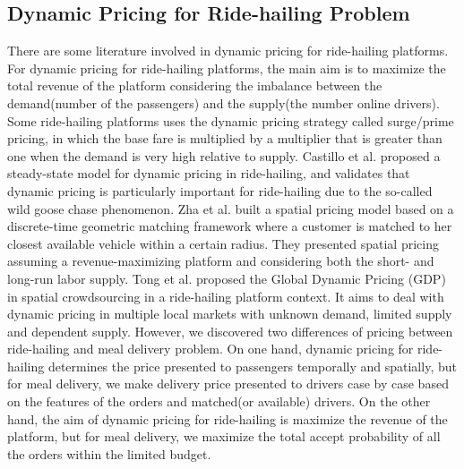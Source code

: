 \documentclass[sigconf,authordraft]{acmart}
\begin{document}
\subsection{Dynamic Pricing for Ride-hailing Problem}
There are some literature involved in dynamic pricing for ride-hailing platforms. For dynamic pricing for ride-hailing platforms, the main aim is to maximize the total revenue of the platform considering the imbalance between the demand(number of the passengers) and the supply(the number online drivers). Some ride-hailing platforms uses the dynamic pricing strategy called surge/prime pricing, in which the base fare is multiplied by a multiplier that is greater than one when the demand is very high relative to supply\cite{hall2015effects}. Castillo et al.\cite{castillo2017surge} proposed a steady-state model for dynamic pricing in ride-hailing, and validates that dynamic pricing is particularly important for ride-hailing due to the so-called wild goose chase phenomenon. Zha et al.\cite{zha2018geometric} built a spatial pricing model based on a discrete-time geometric matching framework where a customer is matched to her closest available vehicle within a certain radius. They presented spatial pricing assuming a revenue-maximizing platform and considering both the short- and long-run labor supply. Tong et al. \cite{tong2018dynamic} proposed the Global Dynamic Pricing (GDP) in spatial crowdsourcing in a ride-hailing platform context. It aims to deal with dynamic pricing in multiple local markets with  unknown demand, limited supply and dependent supply. However, we discovered two differences of pricing between ride-hailing and meal delivery problem. On one hand, dynamic pricing for ride-hailing determines the price presented to passengers temporally and spatially, but for meal delivery, we make delivery price presented to drivers case by case based on the features of the orders and matched(or available) drivers. On the other hand, the aim of dynamic pricing for ride-hailing is maximize the revenue of the platform, but for meal delivery, we maximize the total accept probability of all the orders within the limited budget.
\end{document}
